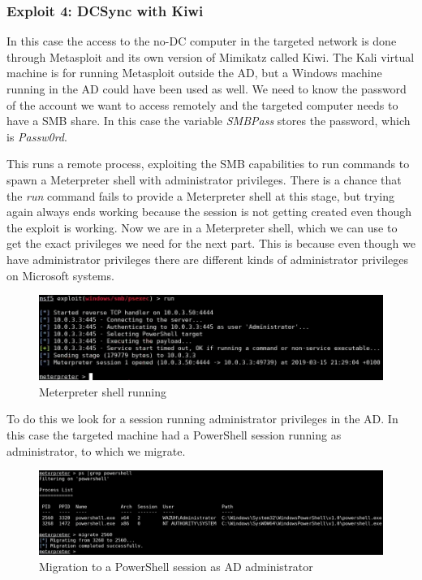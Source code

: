 \subsubsection{Exploit 4: DCSync with Kiwi}
In this case the access to the no-DC computer in the targeted network is done through Metasploit\cite{metasploit} and its own version of Mimikatz called Kiwi\cite{pentestlab}. The Kali virtual machine is for running Metasploit outside the AD, but a Windows machine running in the AD could have been used as well.
\linej
We need to know the password of the account we want to access remotely and the targeted computer needs to have a SMB share.
In this case the variable \textit{SMBPass} stores the password, which is \textit{Passw0rd}.
\linej

\linej
This runs a remote process, exploiting the SMB capabilities to run commands to spawn a Meterpreter shell\cite{meterpreter} with administrator privileges. There is a chance that the \textit{run} command fails to provide a Meterpreter shell at this stage, but trying again always ends working because the session is not getting created even though the exploit is working.
\linej
\linej
Now we are in a Meterpreter shell, which we can use to get the exact privileges we need for the next part. This is because even though we have administrator privileges there are different kinds of administrator privileges on Microsoft systems.
\begin{figure}[H]
	\centering
	\includegraphics[width=\textwidth]{figuras/meterpreter.png}
	\caption{Meterpreter shell running}
\end{figure}

To do this we look for a session running administrator privileges in the AD. In this case the targeted machine had a PowerShell session running as administrator, to which we migrate.
\linej
\begin{figure}[H]
	\centering
	\includegraphics[width=\textwidth]{figuras/migrate.png}
	\caption{Migration to a PowerShell session as AD administrator}
\end{figure}

